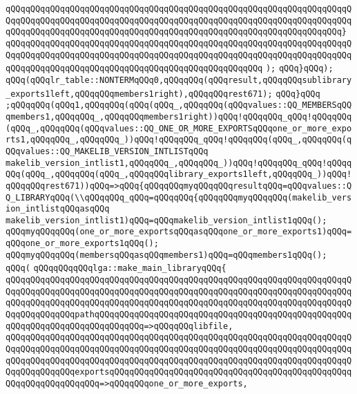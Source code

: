 \verb|qQQqqQQqqQQqqQQqqQQqqQQqqQQqqQQqqQQqqQQqqQQqqQQqqQQqqQQqqQQqqQQqqQQqqQQqqQQqqQQqqQQqqQQqqQQqqQQqqQQqqQQqqQQqqQQqqQQqqQQqqQQqqQQqqQQqqQQqqQQqqQQqqQQqqQQqqQQqqQQqqQQqqQQqqQQqqQQqqQQqqQQqqQQqqQQqqQQqqQQqqQQqqQQq}|\newline
\verb|qQQqqQQqqQQqqQQqqQQqqQQqqQQqqQQqqQQqqQQqqQQqqQQqqQQqqQQqqQQqqQQqqQQqqQQqqQQqqQQqqQQqqQQqqQQqqQQqqQQqqQQqqQQqqQQqqQQqqQQqqQQqqQQqqQQqqQQqqQQqqQQqqQQqqQQqqQQqqQQqqQQqqQQqqQQqqQQqqQQqqQQqqQQqqQQq|\newline
\verb|);|\newline
\verb|qQQq}qQQq);|\newline
\verb|qQQq(qQQqlr_table::NONTERMqQQq0,qQQqqQQq(qQQqresult,qQQqqQQqsublibrary_exports1left,qQQqqQQqmembers1right),qQQqqQQqrest671);|\newline
\verb|qQQq}qQQq|\newline
\verb|;qQQqqQQq(qQQq1,qQQqqQQq(qQQq(qQQq_,qQQqqQQq(qQQqvalues::QQ_MEMBERSqQQqmembers1,qQQqqQQq_,qQQqqQQqmembers1right))qQQq!qQQqqQQq_qQQq!qQQqqQQq(qQQq_,qQQqqQQq(qQQqvalues::QQ_ONE_OR_MORE_EXPORTSqQQqone_or_more_exports1,qQQqqQQq_,qQQqqQQq_))qQQq!qQQqqQQq_qQQq!qQQqqQQq(qQQq_,qQQqqQQq(qQQqvalues::QQ_MAKELIB_VERSION_INTLISTqQQq|\newline
\verb|makelib_version_intlist1,qQQqqQQq_,qQQqqQQq_))qQQq!qQQqqQQq_qQQq!qQQqqQQq(qQQq_,qQQqqQQq(qQQq_,qQQqqQQqlibrary_exports1left,qQQqqQQq_))qQQq!qQQqqQQqrest671))qQQq=>qQQq{qQQqqQQqmyqQQqqQQqresultqQQq=qQQqvalues::QQ_LIBRARYqQQq(\\qQQqqQQq_qQQq=qQQqqQQq{qQQqqQQqmyqQQqqQQq(makelib_version_intlistqQQqasqQQq|\newline
\verb|makelib_version_intlist1)qQQq=qQQqmakelib_version_intlist1qQQq();|\newline
\verb|qQQqmyqQQqqQQq(one_or_more_exportsqQQqasqQQqone_or_more_exports1)qQQq=qQQqone_or_more_exports1qQQq();|\newline
\verb|qQQqmyqQQqqQQq(membersqQQqasqQQqmembers1)qQQq=qQQqmembers1qQQq();|\newline
\verb|qQQq(|\newline
\verb|qQQqqQQqqQQqlga::make_main_libraryqQQq{|\newline
\verb|qQQqqQQqqQQqqQQqqQQqqQQqqQQqqQQqqQQqqQQqqQQqqQQqqQQqqQQqqQQqqQQqqQQqqQQqqQQqqQQqqQQqqQQqqQQqqQQqqQQqqQQqqQQqqQQqqQQqqQQqqQQqqQQqqQQqqQQqqQQqqQQqqQQqqQQqqQQqqQQqqQQqqQQqqQQqqQQqqQQqqQQqqQQqqQQqqQQqqQQqqQQqqQQqqQQqqQQqqQQqqQQqpathqQQqqQQqqQQqqQQqqQQqqQQqqQQqqQQqqQQqqQQqqQQqqQQqqQQqqQQqqQQqqQQqqQQqqQQqqQQqqQQq=>qQQqqQQqlibfile,|\newline
\verb|qQQqqQQqqQQqqQQqqQQqqQQqqQQqqQQqqQQqqQQqqQQqqQQqqQQqqQQqqQQqqQQqqQQqqQQqqQQqqQQqqQQqqQQqqQQqqQQqqQQqqQQqqQQqqQQqqQQqqQQqqQQqqQQqqQQqqQQqqQQqqQQqqQQqqQQqqQQqqQQqqQQqqQQqqQQqqQQqqQQqqQQqqQQqqQQqqQQqqQQqqQQqqQQqqQQqqQQqqQQqqQQqexportsqQQqqQQqqQQqqQQqqQQqqQQqqQQqqQQqqQQqqQQqqQQqqQQqqQQqqQQqqQQqqQQqqQQq=>qQQqqQQqone_or_more_exports,|\newline
